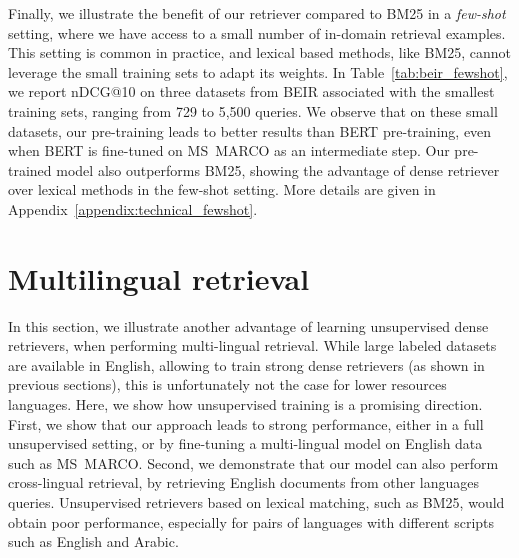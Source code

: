 \documentclass[10pt]{article} %
\begin{document}
Finally, we illustrate the benefit of our retriever compared to BM25 in a \emph{few-shot} setting, where we have access to a small number of in-domain retrieval examples.
This setting is common in practice, and lexical based methods, like BM25, cannot leverage the small training sets to adapt its weights.
In Table~\ref{tab:beir_fewshot}, we report nDCG@10 on three datasets from BEIR associated with the smallest training sets, ranging from 729 to 5,500 queries.
We observe that on these small datasets, our pre-training leads to better results than BERT pre-training, even when BERT is fine-tuned on MS~MARCO as an intermediate step.
Our pre-trained model also outperforms BM25, showing the advantage of dense retriever over lexical methods in the few-shot setting.
More details are given in Appendix~\ref{appendix:technical_fewshot}.

\section{Multilingual retrieval}
In this section, we illustrate another advantage of learning unsupervised dense retrievers, when performing multi-lingual retrieval.
While large labeled datasets are available in English, allowing to train strong dense retrievers (as shown in previous sections), this is unfortunately not the case for lower resources languages.
Here, we show how unsupervised training is a promising direction.
First, we show that our approach leads to strong performance, either in a full unsupervised setting, or by fine-tuning a multi-lingual model on English data such as MS~MARCO.
Second, we demonstrate that our model can also perform cross-lingual retrieval, by retrieving English documents from other languages queries.
Unsupervised retrievers based on lexical matching, such as BM25, would obtain poor performance, especially for pairs of languages with different scripts such as English and Arabic.

\end{document}
